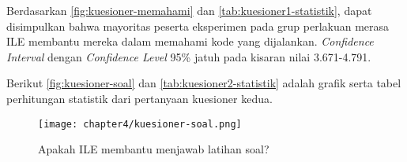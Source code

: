 Berdasarkan \autoref{fig:kuesioner-memahami} dan \autoref{tab:kuesioner1-statistik}, dapat disimpulkan bahwa mayoritas peserta eksperimen pada grup perlakuan merasa ILE membantu mereka dalam memahami kode yang dijalankan. \textit{Confidence Interval} dengan \textit{Confidence Level} 95\% jatuh pada kisaran nilai 3.671-4.791.

Berikut \autoref{fig:kuesioner-soal} dan \autoref{tab:kuesioner2-statistik} adalah grafik serta tabel perhitungan statistik dari pertanyaan kuesioner kedua.

\begin{figure}[H]
  \centering
  \texttt{[image: chapter4/kuesioner-soal.png]}
  \caption{Apakah ILE membantu menjawab latihan soal?} \label{fig:kuesioner-soal}
\end{figure}

